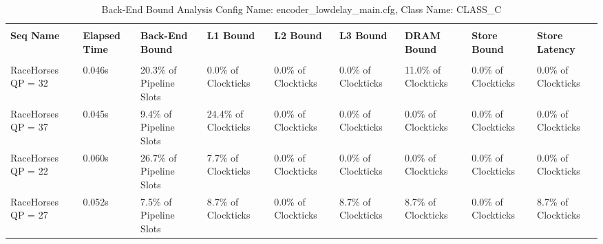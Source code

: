 \documentclass{article}%
\begin{document}
\begin{longtabu}{| X[l] | X[l] | X[l] | X[l] | X[l] | X[l] | X[l] | X[l] | X[l] |}%
\caption{%
Back{-}End Bound Analysis\newline%
 Config Name: encoder\_lowdelay\_main.cfg,\newline%
 Class Name: CLASS\_C\newline%
%
}%
\hline%
&&&&&&&&\\%
\textbf{Seq Name}&\textbf{Elapsed Time}&\textbf{Back{-}End Bound}&\textbf{L1 Bound}&\textbf{L2 Bound}&\textbf{L3 Bound}&\textbf{DRAM Bound}&\textbf{Store Bound}&\textbf{Store Latency}\\%
&&&&&&&&\\%
\hline%
\endhead%
RaceHorses\newline%
 QP = 32&0.046s&20.3\% of Pipeline Slots&0.0\% of Clockticks&0.0\% of Clockticks&0.0\% of Clockticks&11.0\% of Clockticks&0.0\% of Clockticks&0.0\% of Clockticks\\%
\hline%
RaceHorses\newline%
 QP = 37&0.045s&9.4\% of Pipeline Slots&24.4\% of Clockticks&0.0\% of Clockticks&0.0\% of Clockticks&0.0\% of Clockticks&0.0\% of Clockticks&0.0\% of Clockticks\\%
\hline%
RaceHorses\newline%
 QP = 22&0.060s&26.7\% of Pipeline Slots&7.7\% of Clockticks&0.0\% of Clockticks&0.0\% of Clockticks&0.0\% of Clockticks&0.0\% of Clockticks&0.0\% of Clockticks\\%
\hline%
RaceHorses\newline%
 QP = 27&0.052s&7.5\% of Pipeline Slots&8.7\% of Clockticks&0.0\% of Clockticks&8.7\% of Clockticks&8.7\% of Clockticks&0.0\% of Clockticks&8.7\% of Clockticks\\%
\hline%
\end{longtabu}%
\newpage

%
\end{document}
